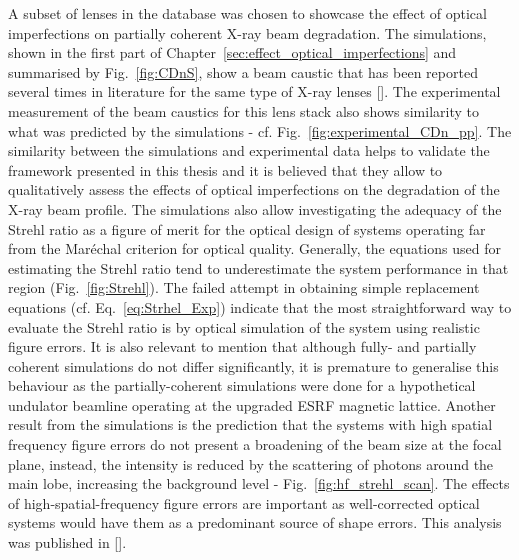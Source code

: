 \begin{refsection}
A subset of lenses in the database was chosen to showcase the effect of optical imperfections on partially coherent X-ray beam degradation. 
The simulations, shown in the first part of Chapter~\ref{sec:effect_optical_imperfections} and summarised by Fig.~\ref{fig:CDnS}, show a beam caustic that has been reported several times in literature for the same type of X-ray lenses [\cite{Schropp2013,Seiboth2017,Seiboth2020}]. The experimental measurement of the beam caustics for this lens stack also shows similarity to what was predicted by the simulations - cf. Fig.~\ref{fig:experimental_CDn_pp}. The similarity between the simulations and experimental data helps to validate the framework presented in this thesis and it is believed that they allow to qualitatively assess the effects of optical imperfections on the degradation of the X-ray beam profile. The simulations also allow investigating the adequacy of the Strehl ratio as a figure of merit for the optical design of systems operating far from the Mar\'echal criterion for optical quality. Generally, the equations used for estimating the Strehl ratio tend to underestimate the system performance in that region (Fig.~\ref{fig:Strehl}). The failed attempt in obtaining simple replacement equations (cf. Eq.~\ref{eq:Strhel_Exp}) indicate that the most straightforward way to evaluate the Strehl ratio is by optical simulation of the system using realistic figure errors. It is also relevant to mention that although fully- and partially coherent simulations do not differ significantly, it is premature to generalise this behaviour as the partially-coherent simulations were done for a hypothetical undulator beamline operating at the upgraded ESRF magnetic lattice. Another result from the simulations is the prediction that the systems with high spatial frequency figure errors do not present a broadening of the beam size at the focal plane, instead, the intensity is reduced by the scattering of photons around the main lobe, increasing the background level - Fig.~\ref{fig:hf_strehl_scan}. The effects of high-spatial-frequency figure errors are important as well-corrected optical systems would have them as a predominant source of shape errors. This analysis was published in [\cite{Celestre2020}].


\end{refsection}
